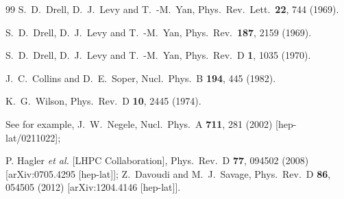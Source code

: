 \documentclass[aps,prd,preprint,tightenlines,superscriptaddress]{revtex4}
\begin{document}
\begin{thebibliography}{99}
  S.~D.~Drell, D.~J.~Levy and T.~-M.~Yan,
  Phys.\ Rev.\ Lett.\  {\bf 22}, 744 (1969).

  S.~D.~Drell, D.~J.~Levy and T.~-M.~Yan,
  Phys.\ Rev.\  {\bf 187}, 2159 (1969).

  S.~D.~Drell, D.~J.~Levy and T.~-M.~Yan,
  Phys.\ Rev.\ D {\bf 1}, 1035 (1970).


  J.~C.~Collins and D.~E.~Soper,
  Nucl.\ Phys.\ B {\bf 194}, 445 (1982).

  K.~G.~Wilson,
  Phys.\ Rev.\ D {\bf 10}, 2445 (1974).

See for example, %
  J.~W.~Negele,
  Nucl.\ Phys.\ A {\bf 711}, 281 (2002)
  [hep-lat/0211022];

  P. Hagler {\it et al.}  [LHPC Collaboration],
  Phys.\ Rev.\ D {\bf 77}, 094502 (2008)
  [arXiv:0705.4295 [hep-lat]];
  Z.~Davoudi and M.~J.~Savage,
  Phys.\ Rev.\ D {\bf 86}, 054505 (2012)
  [arXiv:1204.4146 [hep-lat]].


\end{thebibliography}
\end{document}
